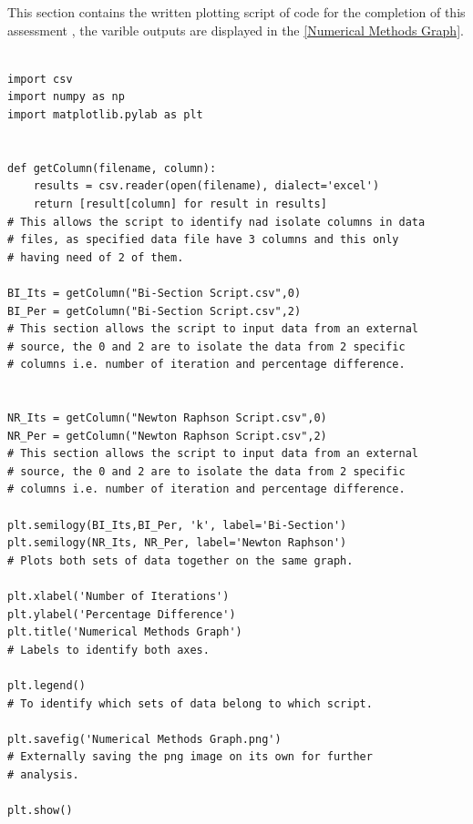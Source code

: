 \documentclass[12pt]{article}
\begin{document}
This section contains the written plotting script of code for the completion of this assessment \cite{Numerical_Methods}, the varible outputs are displayed in the \cref{Numerical Methods Graph}.

\begin{verbatim}

import csv
import numpy as np
import matplotlib.pylab as plt


def getColumn(filename, column):
    results = csv.reader(open(filename), dialect='excel')
    return [result[column] for result in results]
# This allows the script to identify nad isolate columns in data
# files, as specified data file have 3 columns and this only 
# having need of 2 of them.

BI_Its = getColumn("Bi-Section Script.csv",0) 
BI_Per = getColumn("Bi-Section Script.csv",2)
# This section allows the script to input data from an external 
# source, the 0 and 2 are to isolate the data from 2 specific
# columns i.e. number of iteration and percentage difference.


NR_Its = getColumn("Newton Raphson Script.csv",0)
NR_Per = getColumn("Newton Raphson Script.csv",2)
# This section allows the script to input data from an external 
# source, the 0 and 2 are to isolate the data from 2 specific 
# columns i.e. number of iteration and percentage difference.

plt.semilogy(BI_Its,BI_Per, 'k', label='Bi-Section')
plt.semilogy(NR_Its, NR_Per, label='Newton Raphson')
# Plots both sets of data together on the same graph.

plt.xlabel('Number of Iterations')
plt.ylabel('Percentage Difference')
plt.title('Numerical Methods Graph')
# Labels to identify both axes.

plt.legend()
# To identify which sets of data belong to which script.

plt.savefig('Numerical Methods Graph.png')
# Externally saving the png image on its own for further 
# analysis.

plt.show()

\end{verbatim}

\end{document}
